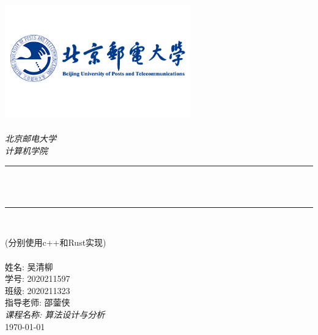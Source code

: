 \begin{titlepage}
	\newcommand{\HRule}{\rule{\linewidth}{0.5mm}}
	\includegraphics[width=8cm]{title/logo_bupt.png}\\[1cm]
	\center
	\quad\\[1.5cm]
	\textsl{\Large 北京邮电大学}\\[0.5cm]
	\textsl{\large  计算机学院}\\[0.5cm]
	\makeatletter
	\HRule \\[0.4cm]
	{\huge \bfseries \@title}\\[0.4cm]
	\HRule \\[0.5cm]
	\begin{minipage}{0.4\textwidth}
	\end{minipage}
	\large {(分别使用c++和Rust实现)}\\[1cm]
	~\\[1cm] %

	\makeatother
	{\large 姓名: 吴清柳}\\[0.5cm]
	{\large 学号: 2020211597}\\[0.5cm]
	{\large 班级: 2020211323}\\[0.5cm]
	{\large 指导老师: 邵蓥侠}\\[0.5cm]
	{\large \emph{课程名称: 算法设计与分析}}\\[0.5cm]
	{\large \today}\\[2cm]
	\vfill
\end{titlepage}
